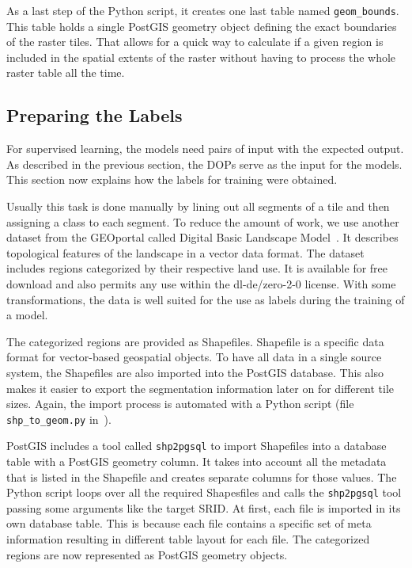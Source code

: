 As a last step of the Python script, it creates one last table named \texttt{geom\_bounds}. This table holds a single PostGIS geometry object defining the exact boundaries of the raster tiles. That allows for a quick way to calculate if a given region is included in the spatial extents of the raster without having to process the whole raster table all the time.

\subsection{Preparing the Labels}
\label{sec:prepare_labels}
For supervised learning, the models need pairs of input with the expected output. As described in the previous section, the DOPs serve as the input for the models. This section now explains how the labels for training were obtained.

Usually this task is done manually by lining out all segments of a tile and then assigning a class to each segment. To reduce the amount of work, we use another dataset from the GEOportal called Digital Basic Landscape Model~\cite{base-dlm20}. It describes topological features of the landscape in a vector data format. The dataset includes regions categorized by their respective land use. It is available for free download and also permits any use within the dl-de/zero-2-0 license. With some transformations, the data is well suited for the use as labels during the training of a model.

The categorized regions are provided as Shapefiles. Shapefile is a specific data format for vector-based geospatial objects. To have all data in a single source system, the Shapefiles are also imported into the PostGIS database. This also makes it easier to export the segmentation information later on for different tile sizes. Again, the import process is automated with a Python script (file \texttt{shp\_to\_geom.py} in~\cite{thesis-code20}).

PostGIS includes a tool called \texttt{shp2pgsql} to import Shapefiles into a database table with a PostGIS geometry column. It takes into account all the metadata that is listed in the Shapefile and creates separate columns for those values. The Python script loops over all the required Shapesfiles and calls the \texttt{shp2pgsql} tool passing some arguments like the target SRID. At first, each file is imported in its own database table. This is because each file contains a specific set of meta information resulting in different table layout for each file. The categorized regions are now represented as PostGIS geometry objects.

